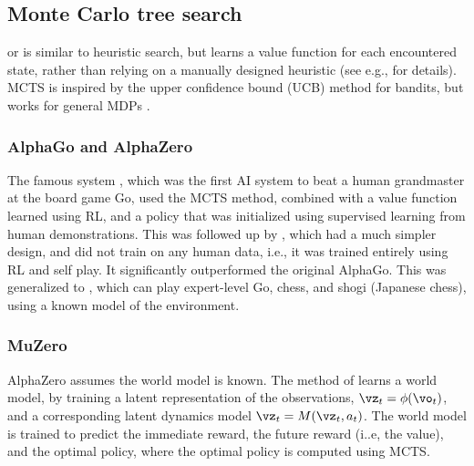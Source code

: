\subsection{Monte Carlo tree search}
\label{sec:MCTS}





or  is similar to heuristic search,
but learns a value function for each encountered state,
rather than relying on a manually designed heuristic
(see e.g., \citep{Munos2014} for details).
MCTS is inspired by the upper confidence bound (UCB)
method for bandits,
but works for general MDPs \citep{Kocsis06}.

\subsubsection{AlphaGo and AlphaZero}
\label{sec:alphaGo}
\label{sec:alphaZero}

The famous  system \citep{alphaGo},
which was the first AI system to beat a human grandmaster at the board game Go,
used the MCTS method,
combined with a value function learned using RL,
and a policy that was initialized using supervised learning
from human demonstrations.
This was followed up by 
\citep{alphaGoZero},
which had a much simpler design,
and did not train on any human data,
i.e., it was trained entirely using RL and self play.
It significantly outperformed the original AlphaGo.
This was generalized to  
\citep{alphaZero},
which can play expert-level Go, chess, and shogi (Japanese chess),
using a known model of the environment.





\subsubsection{MuZero}
\label{sec:muZero}

AlphaZero  assumes the world model is known.
The  method of 
\citep{Schrittwieser2020}
learns a world model, by training a latent
representation of the observations, $\vz_t=\phi(\vo_t)$,
and a corresponding latent dynamics model $\vz_t=M(\vz_t,a_t)$.
The world model is trained
to predict the immediate reward,
the future reward (i..e, the value),
and the optimal policy,
where the optimal policy is computed 
using MCTS.

